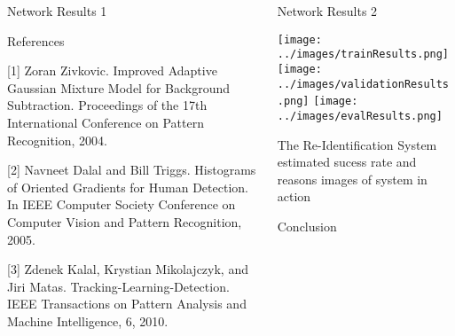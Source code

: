 \documentclass[final]{beamer}
\begin{document}
\begin{frame}{}
\begin{columns}[t]
\begin{column}{.49\linewidth}
        \begin{block}{Network Results 1}
		

        \end{block}
        
        \begin{block}{References}
		\scriptsize
		
[1] Zoran Zivkovic. Improved Adaptive Gaussian Mixture Model for Background Subtraction. Proceedings of the 17th International Conference on Pattern Recognition, 2004.
    
[2] Navneet Dalal and Bill Triggs. Histograms of Oriented Gradients for Human Detection. In IEEE Computer Society Conference on Computer Vision and Pattern Recognition, 2005.

[3] Zdenek Kalal, Krystian Mikolajczyk, and Jiri Matas. Tracking-Learning-Detection. IEEE Transactions on Pattern Analysis and Machine Intelligence, 6, 2010.
		
    \end{block}
    
    
	 \end{column}
	 \begin{column}{.49\linewidth}
 		\begin{block}{Network Results 2}
 		
 		\texttt{[image: ../images/trainResults.png]}  
 		\hspace{.001cm}
 		\texttt{[image: ../images/validationResults.png]}
 		\hspace{.001cm}
        \texttt{[image: ../images/evalResults.png]}
        \end{block}
        
        \begin{block}{The Re-Identification System}
        estimated sucess rate and reasons
        images of system in action
       
 		\hspace{.7cm}
        
        
        \hspace{.7cm}
        \end{block}
        
       	\begin{block}{Conclusion}

        
        \end{block}

      \end{column}
    \end{columns}
     

  \end{frame}
\end{document}
